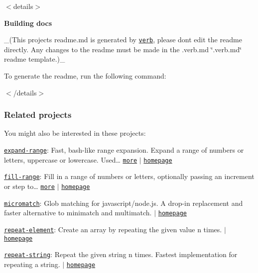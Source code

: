 $<$details$>$ 

{\bfseries Building docs}

\+\_\+(This project\textquotesingle{}s readme.\+md is generated by \href{https://github.com/verbose/verb-generate-readme}{\tt verb}, please don\textquotesingle{}t edit the readme directly. Any changes to the readme must be made in the .verb.\+md \char`\"{}.\+verb.\+md\char`\"{} readme template.)\+\_\+

To generate the readme, run the following command\+:




$<$/details$>$

\subsubsection*{Related projects}

You might also be interested in these projects\+:


\begin{DoxyItemize}
\item \href{https://www.npmjs.com/package/expand-range}{\tt expand-\/range}\+: Fast, bash-\/like range expansion. Expand a range of numbers or letters, uppercase or lowercase. Used… \href{https://github.com/jonschlinkert/expand-range}{\tt more} $\vert$ \href{https://github.com/jonschlinkert/expand-range}{\tt homepage}
\item \href{https://www.npmjs.com/package/fill-range}{\tt fill-\/range}\+: Fill in a range of numbers or letters, optionally passing an increment or {\ttfamily step} to… \href{https://github.com/jonschlinkert/fill-range}{\tt more} $\vert$ \href{https://github.com/jonschlinkert/fill-range}{\tt homepage}
\item \href{https://www.npmjs.com/package/micromatch}{\tt micromatch}\+: Glob matching for javascript/node.\+js. A drop-\/in replacement and faster alternative to minimatch and multimatch. $\vert$ \href{https://github.com/micromatch/micromatch}{\tt homepage}
\item \href{https://www.npmjs.com/package/repeat-element}{\tt repeat-\/element}\+: Create an array by repeating the given value n times. $\vert$ \href{https://github.com/jonschlinkert/repeat-element}{\tt homepage}
\item \href{https://www.npmjs.com/package/repeat-string}{\tt repeat-\/string}\+: Repeat the given string n times. Fastest implementation for repeating a string. $\vert$ \href{https://github.com/jonschlinkert/repeat-string}{\tt homepage}
\end{DoxyItemize}


